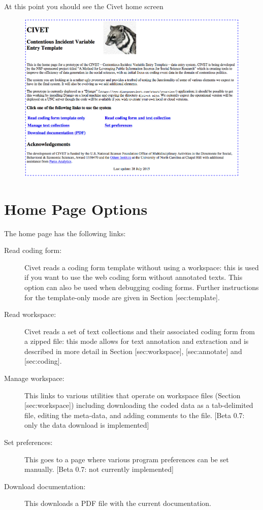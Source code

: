 \documentclass[letterpaper,10pt,english]{sphinxmanual}
\begin{document}
At this point you should see the Civet home screen
\begin{figure}[htbp]
\centering

\includegraphics[width=1.000\linewidth]{civethome.png}
\end{figure}


\chapter{Home Page Options}
\label{homepage:home-page-options}\label{homepage::doc}
The home page has the following links:
\begin{description}
\item[{Read coding form:}] \leavevmode
Civet reads a coding form template without using a workspace: this
is used if you want to use the web coding form without annotated
texts. This option can also be used when debugging coding forms.
Further instructions for the template-only mode are given in Section
{[}sec:template{]}.

\item[{Read workspace:}] \leavevmode
Civet reads a set of text collections and their associated coding
form from a zipped file: this mode allows for text annotation and
extraction and is described in more detail in Section
{[}sec:workspace{]}, {[}sec:annotate{]} and {[}sec:coding{]}.

\item[{Manage workspace:}] \leavevmode
This links to various utilities that operate on workspace files
(Section {[}sec:workspace{]}) including downloading the coded data as a
tab-delimited file, editing the meta-data, and adding comments to
the file. {[}Beta 0.7: only the data download is implemented{]}

\item[{Set preferences:}] \leavevmode
This goes to a page where various program preferences can be set
manually. {[}Beta 0.7: not currently implemented{]}

\item[{Download documentation:}] \leavevmode
This downloads a PDF file with the current documentation.

\end{description}
\end{document}
